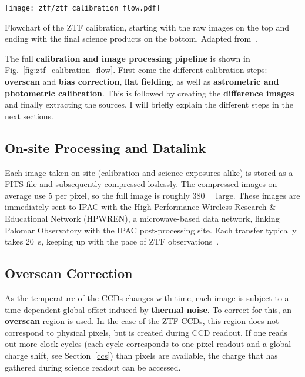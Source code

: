 \begin{marginfigure}
    \texttt{[image: ztf/ztf\_calibration\_flow.pdf]}
    \caption[ZTF realtime flowchart]{Flowchart of the ZTF calibration, starting with the raw images on the top and ending with the final science products on the bottom. Adapted from~\cite{Laher2018}.}
\end{marginfigure}

The full \textbf{calibration and image processing pipeline} is shown in Fig.~\ref{fig:ztf_calibration_flow}. First come the different calibration steps: \textbf{overscan} and \textbf{bias correction}, \textbf{flat fielding}, as well as \textbf{astrometric and photometric calibration}. This is followed by creating the \textbf{difference images} and finally extracting the sources. I will briefly explain the different steps in the next sections.

\subsection{On-site Processing and Datalink}\label{ztf_data_link}

Each image taken on site (calibration and science exposures alike) is stored as a FITS file and subsequently compressed loslessly. The compressed images on average use \SI{5}{\bit} per pixel, so the full image is roughly \SI{380}{\mega\byte} large. These images are immediately sent to IPAC with the High Performance Wireless Research \& Educational Network (HPWREN), a microwave-based data network, linking Palomar Observatory with the IPAC post-processing site. Each transfer typically takes \SI{20}{\second}, keeping up with the pace of ZTF observations~\cite{Dekany2020}.

\subsection{Overscan Correction}
As the temperature of the CCDs changes with time, each image is subject to a time-dependent global offset induced by \textbf{thermal noise}. To correct for this, an \textbf{overscan} region is used. In the case of the ZTF CCDs, this region does not correspond to physical pixels, but is created during CCD readout. If one reads out more clock cycles (each cycle corresponds to one pixel readout and a global charge shift, see Section~\ref{ccs}) than pixels are available, the charge that has gathered during science readout can be accessed. 

